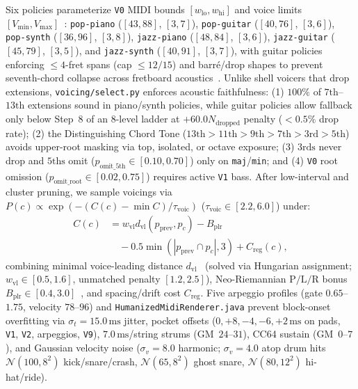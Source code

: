 Six policies parameterize {\small\texttt{V0}} MIDI bounds $[w_{\text{lo}}, w_{\text{hi}}]$ and voice limits $[V_{\text{min}}, V_{\text{max}}]$~\cite{tymoczko2011geometry}: {\small\texttt{pop-piano}} ($[43, 88]$, $[3, 7]$), {\small\texttt{pop-guitar}} ($[40, 76]$, $[3, 6]$), {\small\texttt{pop-synth}} ($[36, 96]$, $[3, 8]$), {\small\texttt{jazz-piano}} ($[48, 84]$, $[3, 6]$), {\small\texttt{jazz-guitar}} ($[45, 79]$, $[3, 5]$), and {\small\texttt{jazz-synth}} ($[40, 91]$, $[3, 7]$), with guitar policies enforcing $\le 4$-fret spans (cap $\le 12/15$) and barr\'e/drop shapes to prevent seventh-chord collapse across fretboard acoustics~\cite{nadar2019towards}. Unlike shell voicers that drop extensions, {\small\texttt{voicing/select.py}} enforces acoustic faithfulness: (1) $100\%$ of $7\text{th}$--$13\text{th}$ extensions sound in piano/synth policies, while guitar policies allow fallback only below Step~8 of an 8-level ladder at $+60.0 N_{\text{dropped}}$ penalty ($< 0.5\%$ drop rate); (2) the Distinguishing Chord Tone ($13\text{th} > 11\text{th} > 9\text{th} > 7\text{th} > 3\text{rd} > 5\text{th}$) avoids upper-root masking via top, isolated, or octave exposure; (3) $3\text{rds}$ never drop and $5\text{ths}$ omit ($p_{\text{omit\_5th}} \in [0.10, 0.70]$) only on {\small\texttt{maj}}/{\small\texttt{min}}; and (4) {\small\texttt{V0}} root omission ($p_{\text{omit\_root}} \in [0.02, 0.75]$) requires active {\small\texttt{V1}} bass. After low-interval and cluster pruning, we sample voicings via $P(c) \propto \exp(-(C(c) - \min C)/\tau_{\text{voic}})$ ($\tau_{\text{voic}} \in [2.2, 6.0]$) under:
\begin{equation}\label{eq:voicing_cost}
  \begin{split}
    C(c) &= w_{\text{vl}} d_{\text{vl}}(p_{\text{prev}}, p_c) - B_{\text{plr}} \\
    &\quad - 0.5 \min(|p_{\text{prev}} \cap p_c|, 3) + C_{\text{reg}}(c),
  \end{split}
\end{equation}
combining minimal voice-leading distance $d_{\text{vl}}$~\cite{tymoczko2006geometry,eitel2024perception} (solved via Hungarian assignment; $w_{\text{vl}} \in [0.5, 1.6]$, unmatched penalty $[1.2, 2.5]$), Neo-Riemannian $\text{P}/\text{L}/\text{R}$ bonus $B_{\text{plr}} \in [0.4, 3.0]$~\cite{cohn1998introduction,douthett1998parsimonious}, and spacing/drift cost $C_{\text{reg}}$. Five arpeggio profiles (gate $0.65$--$1.75$, velocity $78$--$96$) and {\small\texttt{HumanizedMidiRenderer.java}} prevent block-onset overfitting via $\sigma_t = 15.0\,\text{ms}$ jitter, pocket offsets ($0, +8, -4, -6, +2\,\text{ms}$ on pads, {\small\texttt{V1}}, {\small\texttt{V2}}, arpeggios, {\small\texttt{V9}}), $7.0\,\text{ms}$/string strums (GM~$24$--$31$), CC64 sustain (GM~$0$--$7$), and Gaussian velocity noise ($\sigma_v = 8.0$ harmonic; $\sigma_v = 4.0$ atop drum hits $\mathcal{N}(100, 8^2)$ kick/snare/crash, $\mathcal{N}(65, 8^2)$ ghost snare, $\mathcal{N}(80, 12^2)$ hi-hat/ride).

